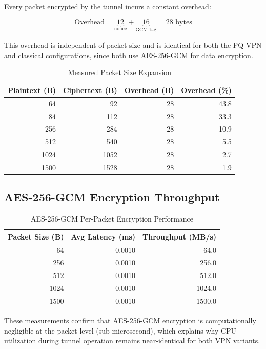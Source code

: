 \documentclass[conference,onecolumn]{IEEEtran}
\begin{document}
Every packet encrypted by the tunnel incurs a constant overhead:

\begin{equation}
\text{Overhead} = \underbrace{12}_{\text{nonce}} + \underbrace{16}_{\text{GCM tag}} = 28 \text{ bytes}
\end{equation}

This overhead is independent of packet size and is identical for both the PQ-VPN and classical configurations, since both use AES-256-GCM for data encryption.

\begin{table}[H]
\centering
\caption{Measured Packet Size Expansion}
\label{tab:overhead}
\begin{tabular}{rrrr}
\toprule
\textbf{Plaintext (B)} & \textbf{Ciphertext (B)} & \textbf{Overhead (B)} & \textbf{Overhead (\%)} \\
\midrule
64   & 92   & 28 & 43.8 \\
84   & 112  & 28 & 33.3 \\
256  & 284  & 28 & 10.9 \\
512  & 540  & 28 &  5.5 \\
1024 & 1052 & 28 &  2.7 \\
1500 & 1528 & 28 &  1.9 \\
\bottomrule
\end{tabular}
\end{table}

\subsection{AES-256-GCM Encryption Throughput}

\begin{table}[H]
\centering
\caption{AES-256-GCM Per-Packet Encryption Performance}
\label{tab:aes}
\begin{tabular}{rrr}
\toprule
\textbf{Packet Size (B)} & \textbf{Avg Latency (ms)} & \textbf{Throughput (MB/s)} \\
\midrule
64   & 0.0010 &   64.0 \\
256  & 0.0010 &  256.0 \\
512  & 0.0010 &  512.0 \\
1024 & 0.0010 & 1024.0 \\
1500 & 0.0010 & 1500.0 \\
\bottomrule
\end{tabular}
\end{table}

These measurements confirm that AES-256-GCM encryption is computationally negligible at the packet level (sub-microsecond), which explains why CPU utilization during tunnel operation remains near-identical for both VPN variants.
\end{document}
